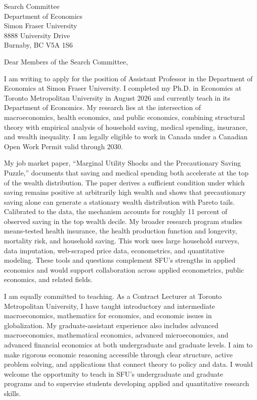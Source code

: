 \documentclass[10pt]{letter}
\begin{document}
\begin{letter}{Search Committee\\Department of Economics\\Simon Fraser University\\8888 University Drive\\Burnaby, BC V5A 1S6}
\opening{Dear Members of the Search Committee,}

I am writing to apply for the position of Assistant Professor in the Department of Economics at Simon Fraser University. I completed my Ph.D. in Economics at Toronto Metropolitan University in August 2026 and currently teach in its Department of Economics. My research lies at the intersection of macroeconomics, health economics, and public economics, combining structural theory with empirical analysis of household saving, medical spending, insurance, and wealth inequality. I am legally eligible to work in Canada under a Canadian Open Work Permit valid through 2030.

My job market paper, ``Marginal Utility Shocks and the Precautionary Saving Puzzle,'' documents that saving and medical spending both accelerate at the top of the wealth distribution. The paper derives a sufficient condition under which saving remains positive at arbitrarily high wealth and shows that precautionary saving alone can generate a stationary wealth distribution with Pareto tails. Calibrated to the data, the mechanism accounts for roughly 11 percent of observed saving in the top wealth decile. My broader research program studies means-tested health insurance, the health production function and longevity, mortality risk, and household saving. This work uses large household surveys, data imputation, web-scraped price data, econometrics, and quantitative modeling. These tools and questions complement SFU's strengths in applied economics and would support collaboration across applied econometrics, public economics, and related fields.

I am equally committed to teaching. As a Contract Lecturer at Toronto Metropolitan University, I have taught introductory and intermediate macroeconomics, mathematics for economics, and economic issues in globalization. My graduate-assistant experience also includes advanced macroeconomics, mathematical economics, advanced microeconomics, and advanced financial economics at both undergraduate and graduate levels. I aim to make rigorous economic reasoning accessible through clear structure, active problem solving, and applications that connect theory to policy and data. I would welcome the opportunity to teach in SFU's undergraduate and graduate programs and to supervise students developing applied and quantitative research skills.


\end{letter}
\end{document}
